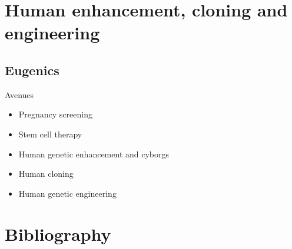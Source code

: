 \documentclass[ignorenonframetext,aspectratio=169]{beamer}
\providecommand{\tightlist}{%
  \setlength{\itemsep}{0pt}\setlength{\parskip}{0pt}}
\begin{document}
\hypertarget{human-enhancement-cloning-and-engineering}{%
\section{Human enhancement, cloning and
engineering}\label{human-enhancement-cloning-and-engineering}}

\hypertarget{eugenics}{%
\subsection{Eugenics}\label{eugenics}}

\begin{frame}{Avenues}
\protect\hypertarget{avenues}{}

\begin{itemize}
\tightlist
\item
  Pregnancy screening
\item
  Stem cell therapy
\item
  Human genetic enhancement and cyborgs
\item
  Human cloning
\item
  Human genetic engineering
\end{itemize}

\end{frame}

\hypertarget{bibliography}{%
\section{Bibliography}\label{bibliography}}
\end{document}
